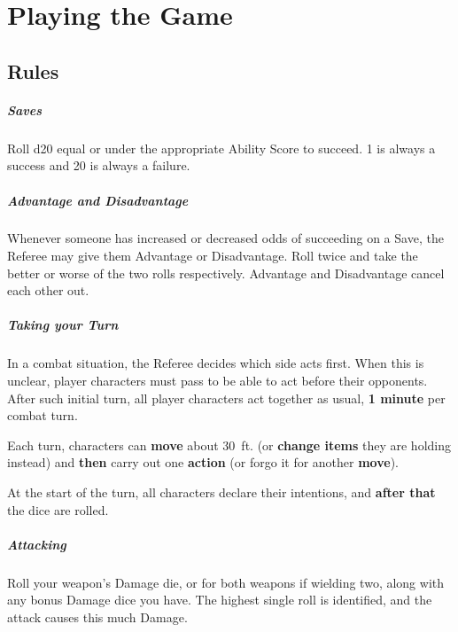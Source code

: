 \documentclass[itdr/core]{subfiles}
\begin{document}
\cleartoleftpage

\chapter{Playing the Game}
\label{ch:playing_the_game}

\section{Rules}

\paragraph{Saves}
Roll d20 equal or under the appropriate Ability Score to succeed. 1 is always a success and 20 is \mbox{always} a failure.


\paragraph{Advantage and Disadvantage}
Whenever someone has increased or decreased odds of succeeding on a Save, the Referee may give them Advantage or Disadvantage. Roll twice and take the better or worse of the two rolls respectively. Advantage and Disadvantage cancel each other out.


\paragraph{Taking your Turn}
In a combat situation, the Referee decides which side acts first. When this is unclear, player characters must pass  to be able to act before their opponents. After such initial turn, all player characters act together as usual, \textbf{1 minute} per combat turn.

Each turn, characters can \textbf{move} about 30~ft. (or \textbf{change items} they are holding instead) and \textbf{then} carry out one \textbf{action} (or forgo it for another \textbf{move}).

At the start of the turn, all characters declare their \mbox{intentions}, and \textbf{after that} the dice are rolled.


\paragraph{Attacking}
Roll your weapon's Damage die, or for both weapons if wielding two, along with any bonus Damage dice you have. The highest single roll is identified, and the attack causes this much Damage.
\end{document}
